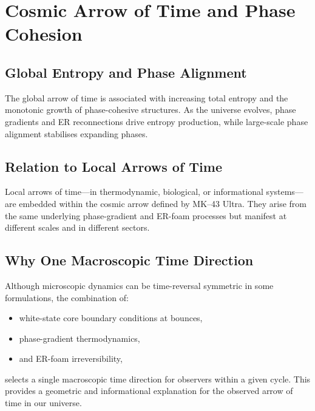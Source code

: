 \chapter{Cosmic Arrow of Time and Phase Cohesion}

\section{Global Entropy and Phase Alignment}

The global arrow of time is associated with increasing total entropy and the monotonic growth of phase-cohesive structures.
As the universe evolves, phase gradients and ER reconnections drive entropy production, while large-scale phase alignment stabilises expanding phases.

\section{Relation to Local Arrows of Time}

Local arrows of time---in thermodynamic, biological, or informational systems---are embedded within the cosmic arrow defined by MK--43 Ultra.
They arise from the same underlying phase-gradient and ER-foam processes but manifest at different scales and in different sectors.

\section{Why One Macroscopic Time Direction}

Although microscopic dynamics can be time-reversal symmetric in some formulations, the combination of:
\begin{itemize}
  \item white-state core boundary conditions at bounces,
  \item phase-gradient thermodynamics,
  \item and ER-foam irreversibility,
\end{itemize}
selects a single macroscopic time direction for observers within a given cycle.
This provides a geometric and informational explanation for the observed arrow of time in our universe.
